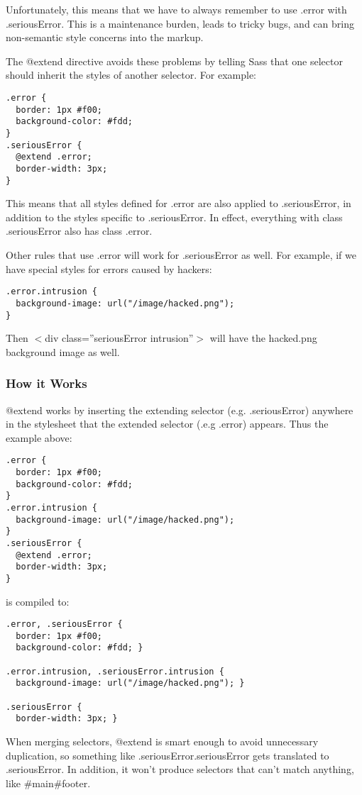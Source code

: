 \documentclass[9pt]{article}
\begin{document}
 Unfortunately, this means that we have to always remember to use .error with .seriousError. This is a maintenance burden, leads to tricky bugs, and can bring non-semantic style concerns into the markup.


 The @extend directive avoids these problems by telling Sass that one selector should inherit the styles of another selector. For example:
\begin{verbatim}
.error {
  border: 1px #f00;
  background-color: #fdd;
}
.seriousError {
  @extend .error;
  border-width: 3px;
}
\end{verbatim}


 This means that all styles defined for .error are also applied to .seriousError, in addition to the styles specific to .seriousError. In effect, everything with class .seriousError also has class .error.


 Other rules that use .error will work for .seriousError as well. For example, if we have special styles for errors caused by hackers:
\begin{verbatim}
.error.intrusion {
  background-image: url("/image/hacked.png");
}
\end{verbatim}


 Then $<$div class=''seriousError intrusion''$>$ will have the hacked.png background image as well.
\subsubsection{How it Works}


 @extend works by inserting the extending selector (e.g. .seriousError) anywhere in the stylesheet that the extended selector (.e.g .error) appears. Thus the example above:
\begin{verbatim}
.error {
  border: 1px #f00;
  background-color: #fdd;
}
.error.intrusion {
  background-image: url("/image/hacked.png");
}
.seriousError {
  @extend .error;
  border-width: 3px;
}
\end{verbatim}


 is compiled to:
\begin{verbatim}
.error, .seriousError {
  border: 1px #f00;
  background-color: #fdd; }

.error.intrusion, .seriousError.intrusion {
  background-image: url("/image/hacked.png"); }

.seriousError {
  border-width: 3px; }
\end{verbatim}


 When merging selectors, @extend is smart enough to avoid unnecessary duplication, so something like .seriousError.seriousError gets translated to .seriousError. In addition, it won’t produce selectors that can’t match anything, like \#main\#footer.
\end{document}
